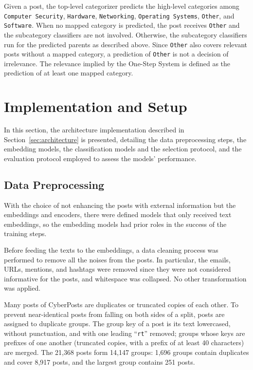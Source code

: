 Given a post, the top-level categorizer predicts the high-level categories among \texttt{Computer Security}, \texttt{Hardware}, \texttt{Networking}, \texttt{Operating Systems}, \texttt{Other}, and \texttt{Software}. When no mapped category is predicted, the post receives \texttt{Other} and the subcategory classifiers are not involved. Otherwise, the subcategory classifiers run for the predicted parents as described above. Since \texttt{Other} also covers relevant posts without a mapped category, a prediction of \texttt{Other} is not a decision of irrelevance. The relevance implied by the One-Step System is defined as the prediction of at least one mapped category.

\section{Implementation and Setup}\label{sec:implementation-and-setup}
In this section, the architecture implementation described in Section~\ref{sec:architecture} is presented, detailing the data preprocessing steps, the embedding models, the classification models and the selection protocol, and the evaluation protocol employed to assess the models' performance.

\subsection{Data Preprocessing}\label{subsec:data-preprocessing}
With the choice of not enhancing the posts with external information but the embeddings and encoders, there were defined models that only received text embeddings, so the embedding models had prior roles in the success of the training steps.

Before feeding the texts to the embeddings, a data cleaning process was performed to remove all the noises from the posts. In particular, the emails, URLs, mentions, and hashtags were removed since they were not considered informative for the posts, and whitespace was collapsed. No other transformation was applied.

Many posts of CyberPosts are duplicates or truncated copies of each other. To prevent near-identical posts from falling on both sides of a split, posts are assigned to duplicate groups. The group key of a post is its text lowercased, without punctuation, and with one leading ``\texttt{rt}'' removed; groups whose keys are prefixes of one another (truncated copies, with a prefix of at least 40 characters) are merged. The 21,368 posts form 14,147 groups: 1,696 groups contain duplicates and cover 8,917 posts, and the largest group contains 251 posts.

